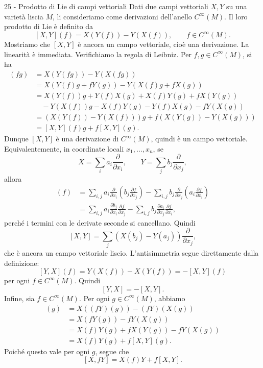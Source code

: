 \documentclass[a4paper]{article}
\begin{document}
\begin{snippetsolution}{25 - Prodotto di Lie di campi vettoriali}
    Dati due campi vettoriali \(X,Y\) su una varietà liscia \(M\), li consideriamo come derivazioni dell'anello \(C^\infty(M)\). Il loro prodotto di Lie è definito da
    \[
        [X,Y](f)=X(Y(f))-Y(X(f)),
        \qquad f\in C^\infty(M).
    \]
    Mostriamo che \([X,Y]\) è ancora un campo vettoriale, cioè una derivazione. La linearità è immediata. Verifichiamo la regola di Leibniz. Per \(f,g\in C^\infty(M)\), si ha
    \begin{align*}
        [X,Y](fg)
        &=
        X(Y(fg))-Y(X(fg))\\
        &=
        X(Y(f)g+fY(g))-Y(X(f)g+fX(g))\\
        &=
        X(Y(f))g+Y(f)X(g)+X(f)Y(g)+fX(Y(g))\\
        &\quad -Y(X(f))g-X(f)Y(g)-Y(f)X(g)-fY(X(g))\\
        &=
        \left(X(Y(f))-Y(X(f))\right)g
        +
        f\left(X(Y(g))-Y(X(g))\right)\\
        &=
        [X,Y](f)g+f[X,Y](g).
    \end{align*}
    Dunque \([X,Y]\) è una derivazione di \(C^\infty(M)\), quindi è un campo vettoriale.
    Equivalentemente, in coordinate locali \(x_1,\dots,x_n\), se
    \[
        X=\sum_i a_i\frac{\partial}{\partial x_i},
        \qquad
        Y=\sum_j b_j\frac{\partial}{\partial x_j},
    \]
    allora
    \begin{align*}
        [X,Y](f)
        &=
        \sum_{i,j}a_i\frac{\partial}{\partial x_i}\left(b_j\frac{\partial f}{\partial x_j}\right)
        -
        \sum_{i,j}b_j\frac{\partial}{\partial x_j}\left(a_i\frac{\partial f}{\partial x_i}\right)\\
        &=
        \sum_{i,j}a_i\frac{\partial b_j}{\partial x_i}\frac{\partial f}{\partial x_j}
        -
        \sum_{i,j}b_j\frac{\partial a_i}{\partial x_j}\frac{\partial f}{\partial x_i},
    \end{align*}
    perché i termini con le derivate seconde si cancellano. Quindi
    \[
        [X,Y]
        =
        \sum_j
        \left(
            X(b_j)-Y(a_j)
        \right)
        \frac{\partial}{\partial x_j},
    \]
    che è ancora un campo vettoriale liscio.
    L'antisimmetria segue direttamente dalla definizione:
    \[
        [Y,X](f)
        =
        Y(X(f))-X(Y(f))
        =
        -[X,Y](f)
    \]
    per ogni \(f\in C^\infty(M)\). Quindi
    \[
        [Y,X]=-[X,Y].
    \]
    Infine, sia \(f\in C^\infty(M)\). Per ogni \(g\in C^\infty(M)\), abbiamo
    \begin{align*}
        [X,fY](g)
        &=
        X((fY)(g))-(fY)(X(g))\\
        &=
        X(fY(g))-fY(X(g))\\
        &=
        X(f)Y(g)+fX(Y(g))-fY(X(g))\\
        &=
        X(f)Y(g)+f[X,Y](g).
    \end{align*}
    Poiché questo vale per ogni \(g\), segue che
    \[
        [X,fY]=X(f)Y+f[X,Y].
    \]
\end{snippetsolution}
\end{document}
